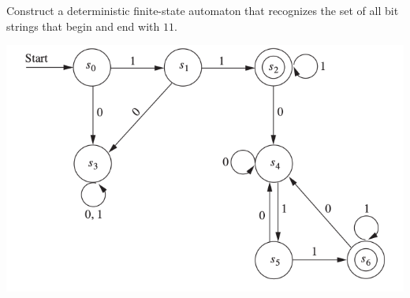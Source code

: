 \documentclass[../main.tex]{subfiles}
\begin{document}
Construct a deterministic finite-state automaton that recognizes the set of all bit strings that begin and end with $11$.

\solution
\includegraphics[width=\textwidth]{img/A13_3_31}
\end{document}
